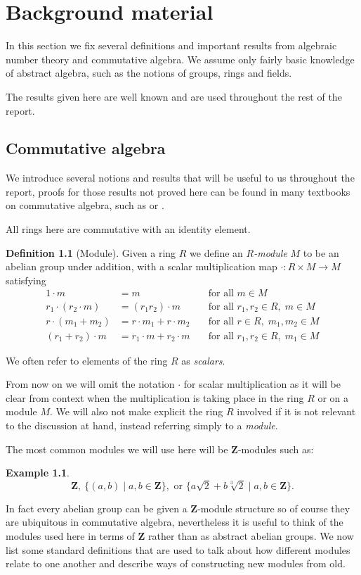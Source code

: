 \documentclass[12pt,a4paper,abstracton,bibtotoc]{scrreprt}
\theoremstyle{definition}
\newtheorem{defn}{Definition}
\newtheorem{ex}{Example}
\newcommand{\ZZ}{\mathbf{Z}}
\begin{document}
\chapter{Background material}
\label{chap:background}

In this section we fix several definitions and important results from algebraic number theory and commutative algebra.
We assume only fairly basic knowledge of abstract algebra, such as the notions of groups, rings and fields.

The results given here are well known and are used throughout the rest of the report.

\section{Commutative algebra}
\label{sec:ca}
We introduce several notions and results that will be useful to us throughout the report, proofs for those results not proved here can be found in many textbooks on commutative algebra, such as \cite{am} or \cite{matsumura}.

All rings here are commutative with an identity element.
\begin{defn}[Module]
Given a ring $R$ we define an \emph{$R$-module} $M$ to be an abelian group under addition, with a scalar multiplication map $\cdot \colon R\times M \to M$ satisfying
\begin{align*}
1\cdot m &= m \; &&\text{for all } m\in M \\
r_1\cdot(r_2 \cdot m) &= (r_1r_2)\cdot m \; &&\text{for all } r_1,r_2\in R,\; m\in M \\
r\cdot(m_1 + m_2) &= r\cdot m_1 + r\cdot m_2 \; &&\text{for all } r\in R, \; m_1,m_2\in M \\
(r_1 + r_2)\cdot m &= r_1\cdot m + r_2\cdot m \; &&\text{for all } r_1,r_2\in R, \; m_1\in M
\end{align*}
\end{defn}

We often refer to elements of the ring $R$ as \emph{scalars}.

From now on we will omit the notation $\cdot$ for scalar multiplication as it will be clear from context when the multiplication is taking place in the ring $R$ or on a module $M$.
We will also not make explicit the ring $R$ involved if it is not relevant to the discussion at hand, instead referring simply to a \emph{module}.

The most common modules we will use here will be $\ZZ$-modules such as:
\begin{ex}
\[
\ZZ,\ \{(a,b)\mid a,b\in \ZZ\},\text{ or }\{a\sqrt{2} + b\sqrt[3]{2}\mid a,b\in \ZZ\}.
\]
\end{ex}
In fact every abelian group can be given a $\ZZ$-module structure so of course they are ubiquitous in commutative algebra, nevertheless it is useful to think of the modules used here in terms of $\ZZ$ rather than as abstract abelian groups.
We now list some standard definitions that are used to talk about how different modules relate to one another and describe ways of constructing new modules from old.
\end{document}
